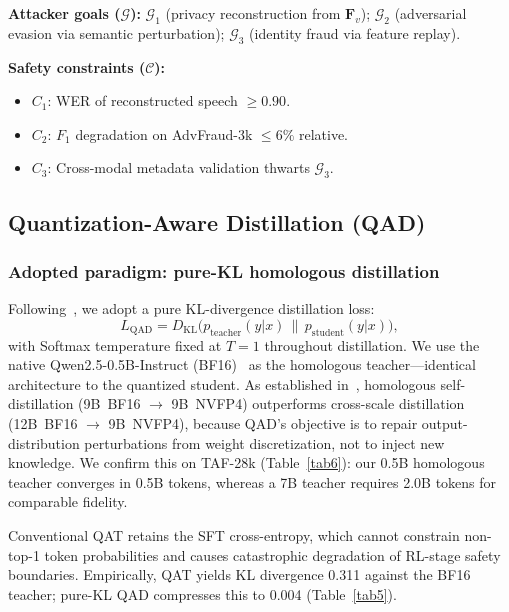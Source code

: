 \documentclass[lettersize,journal]{IEEEtran}
\begin{document}
\textbf{Attacker goals ($\mathcal{G}$):} $\mathcal{G}_1$ (privacy
reconstruction from $\bm{F}_v$); $\mathcal{G}_2$ (adversarial evasion
via semantic perturbation); $\mathcal{G}_3$ (identity fraud via
feature replay).

\textbf{Safety constraints ($\mathcal{C}$):}
\begin{itemize}
  \item $C_1$: WER of reconstructed speech $\ge 0.90$.
  \item $C_2$: $F_1$ degradation on AdvFraud-3k $\le 6\%$ relative.
  \item $C_3$: Cross-modal metadata validation thwarts $\mathcal{G}_3$.
\end{itemize}

\subsection{Quantization-Aware Distillation (QAD)}
\label{sec:qad}

\subsubsection{Adopted paradigm: pure-KL homologous distillation}

Following~\cite{3}, we adopt a pure KL-divergence distillation loss:
\begin{equation}
  L_{\mathrm{QAD}} = D_{\mathrm{KL}}\!\bigl(
    p_{\text{teacher}}(y|x)\,\|\,p_{\text{student}}(y|x)\bigr),
  \label{eq:qad}
\end{equation}
with Softmax temperature fixed at $T=1$ throughout distillation.
We use the native Qwen2.5-0.5B-Instruct (BF16)~\cite{27,28,29} as
the homologous teacher---identical architecture to the quantized
student.  As established in~\cite{3}, homologous self-distillation
(9B~BF16 $\rightarrow$ 9B~NVFP4) outperforms cross-scale distillation
(12B~BF16 $\rightarrow$ 9B~NVFP4), because QAD's objective is to
repair output-distribution perturbations from weight discretization,
not to inject new knowledge.  We confirm this on TAF-28k
(Table~\ref{tab6}): our 0.5B homologous teacher converges in 0.5B
tokens, whereas a 7B teacher requires 2.0B tokens for comparable
fidelity.

Conventional QAT retains the SFT cross-entropy, which cannot
constrain non-top-1 token probabilities and causes catastrophic
degradation of RL-stage safety boundaries.  Empirically, QAT yields
KL divergence 0.311 against the BF16 teacher; pure-KL QAD compresses
this to 0.004 (Table~\ref{tab5}).
\end{document}
